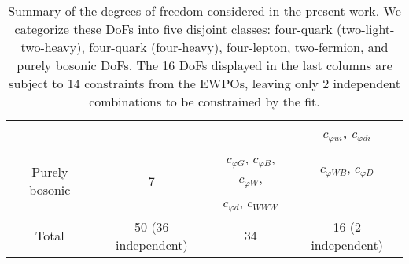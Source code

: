 \begin{table}[htbp]
\begin{center}
\begin{tabular}{cccc}
       &    &       &   ${{c_{\varphi u i}}}$,
        ${{c_{\varphi d i}}}$ \\
       \midrule
      \multirow{2}{*}{Purely bosonic}     &  \multirow{2}{*}{7} &
      $c_{\varphi G}$, $c_{\varphi B}$, $c_{\varphi W}$,   &  $c_{\varphi W B}$, $c_{\varphi D}$   \\
               &   &  $c_{\varphi d}$,  $c_{WWW}$   &  \\
            \midrule
          Total  & 50 (36 independent)   & 34   & 16 (2 independent)   \\
         \bottomrule
  \end{tabular}
  \caption{\small \label{tab:operatorbasis} Summary of the degrees of freedom
  considered in the present work.
   We categorize these DoFs into five disjoint classes: four-quark (two-light-two-heavy),
   four-quark (four-heavy), four-lepton, two-fermion, and purely bosonic DoFs.
   The 16 DoFs displayed in the last columns are subject to 14 constraints from the EWPOs,
   leaving only 2 independent combinations to be constrained by the fit.
 }
  \end{center}
\end{table}
